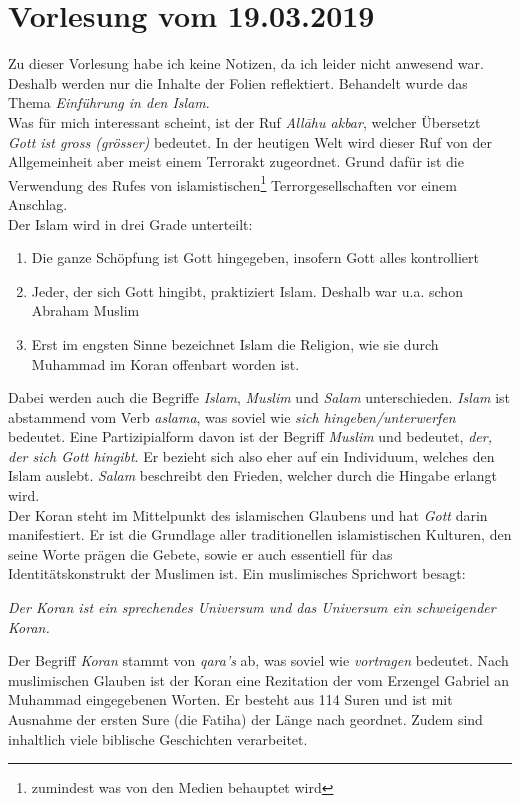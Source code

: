 \section{Vorlesung vom 19.03.2019}
Zu dieser Vorlesung habe ich keine Notizen, da ich leider nicht anwesend war. Deshalb werden nur die Inhalte der Folien reflektiert. Behandelt wurde das Thema \textit{\glqq Einführung in den Islam\grqq}. \\

Was für mich interessant scheint, ist der Ruf \textit{\glqq All\={a}hu akbar\grqq}, welcher Übersetzt \textit{Gott ist gross (grösser)} bedeutet. In der heutigen Welt wird dieser Ruf von der Allgemeinheit aber meist einem Terrorakt zugeordnet. Grund dafür ist die Verwendung des Rufes von islamistischen\footnote{zumindest was von den Medien behauptet wird} Terrorgesellschaften vor einem Anschlag. \\

Der Islam wird in drei Grade unterteilt:
\begin{enumerate}
	\item 	Die ganze Schöpfung ist Gott
			hingegeben, insofern Gott alles
			kontrolliert\\
	\item 	Jeder, der sich Gott hingibt,
			praktiziert Islam. Deshalb war 					u.a. schon Abraham Muslim\\
	\item 	Erst im engsten Sinne bezeichnet
			Islam die Religion, wie sie durch
			Muhammad im Koran offenbart worden 			ist.\\
\end{enumerate}

Dabei werden auch die Begriffe \textit{Islam}, \textit{Muslim} und \textit{Salam} unterschieden. \textit{Islam} ist abstammend vom Verb \textit{aslama}, was soviel wie \textit{sich hingeben/unterwerfen} bedeutet. Eine Partizipialform davon ist der Begriff \textit{Muslim} und bedeutet, \textit{der, der sich Gott hingibt}. Er bezieht sich also eher auf ein Individuum, welches den Islam auslebt. \textit{Salam} beschreibt den Frieden, welcher durch die Hingabe erlangt wird.\\

Der Koran steht im Mittelpunkt des islamischen Glaubens und hat \textit{Gott} darin manifestiert. Er ist die Grundlage aller traditionellen islamistischen Kulturen, den seine Worte prägen die Gebete, sowie er auch essentiell für das Identitätskonstrukt der Muslimen ist. Ein muslimisches Sprichwort besagt:\\

\begin{center}
	\textit{\glqq Der Koran ist ein 				sprechendes Universum und das Universum 		ein schweigender Koran.\grqq}\\
\end{center}

Der Begriff \textit{Koran} stammt von \textit{qara's} ab, was soviel wie \textit{vortragen} bedeutet. Nach muslimischen Glauben ist der Koran eine Rezitation der vom Erzengel Gabriel an Muhammad eingegebenen Worten. Er besteht aus 114 Suren und ist mit Ausnahme der ersten Sure (die Fatiha) der Länge nach geordnet. Zudem sind inhaltlich viele biblische Geschichten verarbeitet. \\